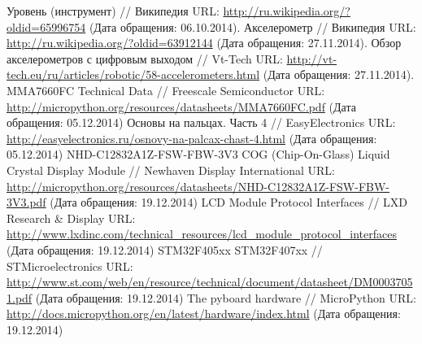 \documentclass[document.tex]{subfiles}
\begin{document}
\clearpage
{}
\begin{thebibliography}{@@@@}	
		Уровень (инструмент) // Википедия
		URL: {\url{http://ru.wikipedia.org/?oldid=65996754}} 
		(Дата обращения: 06.10.2014).
		Акселерометр // Википедия
		URL: {\url{http://ru.wikipedia.org/?oldid=63912144}}
		(Дата обращения: 27.11.2014).
		Обзор акселерометров с цифровым выходом // Vt-Tech
		URL: {\url{http://vt-tech.eu/ru/articles/robotic/58-accelerometers.html}}
		(Дата обращения: 27.11.2014).
		MMA7660FC Technical Data // Freescale Semiconductor
		URL: {\url{http://micropython.org/resources/datasheets/MMA7660FC.pdf}}
		(Дата обращения: 05.12.2014)
		Основы на пальцах. Часть 4 // EasyElectronics
		URL: {\url{http://easyelectronics.ru/osnovy-na-palcax-chast-4.html}}
		(Дата обращения: 05.12.2014)
		NHD-C12832A1Z-FSW-FBW-3V3 COG (Chip-On-Glass) Liquid Crystal Display Module // Newhaven Display International
		URL: {\url{http://micropython.org/resources/datasheets/NHD-C12832A1Z-FSW-FBW-3V3.pdf}}
		(Дата обращения: 19.12.2014)
		LCD Module Protocol Interfaces // LXD Research & Display
		URL: {\url{http://www.lxdinc.com/technical_resources/lcd_module_protocol_interfaces}}
		(Дата обращения: 19.12.2014)
		STM32F405xx STM32F407xx // STMicroelectronics
		URL: {\url{http://www.st.com/web/en/resource/technical/document/datasheet/DM00037051.pdf}}
		(Дата обращения: 19.12.2014)
		The pyboard hardware // MicroPython
		URL: {\url{http://docs.micropython.org/en/latest/hardware/index.html}}
		(Дата обращения: 19.12.2014)
	\end{thebibliography}
\end{document}
